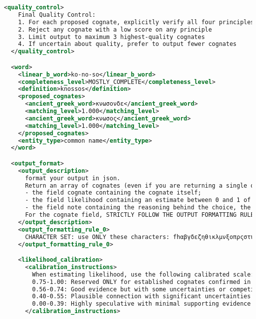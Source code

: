 \begin{lstlisting}[style=mystyle, language=XML, breaklines=true]
  <quality_control>
    Final Quality Control:
    1. For each proposed cognate, explicitly verify all four principles
    2. Reject any cognate with a low score on any principle
    3. Limit output to maximum 3 highest-quality cognates
    4. If uncertain about quality, prefer to output fewer cognates
  </quality_control>

  <word>
    <linear_b_word>ko-no-so</linear_b_word>
    <completeness_level>MOSTLY_COMPLETE</completeness_level>
    <definition>knossos</definition>
    <proposed_cognates>
      <ancient_greek_word>κνωσονδε</ancient_greek_word>
      <matching_level>1.000</matching_level>
      <ancient_greek_word>κνωσος</ancient_greek_word>
      <matching_level>1.000</matching_level>
    </proposed_cognates>
    <entity_type>common name</entity_type>
  </word>

  <output_format>
    <output_description>
      format your output in json.
      Return an array of cognates (even if you are returning a single one) containing three fields:
      - the field cognate containing the cognate itself;
      - the field likelihood containing an estimate between 0 and 1 of how much you are sure the words are cognates, according to rules specified below in the section likelihood calibration and downweighting.
      - the field note containing the reasoning behind the choice, the applied phenomena and the passed and unpassed checks.
      For the cognate field, STRICTLY FOLLOW THE OUTPUT FORMATTING RULES
    </output_description>
    <output_formatting_rule_0>
      CHARACTER SET: use ONLY these characters: fhαβγδεζηθικλμνξοπρςστυφχψω. DO NOT use accents, breathing marks, subscript iota, or other diacritics.FORMAT: Output up to 3 cognates.
    </output_formatting_rule_0>

    <likelihood_calibration>
      <calibration_instructions>
        When estimating likelihood, use the following calibrated scale:
        0.75-1.00: Reserved ONLY for established cognates confirmed in scholarly literature with near certainty
        0.56-0.74: Good evidence but with some uncertainties or competing explanations
        0.40-0.55: Plausible connection with significant uncertainties
        0.00-0.39: Highly speculative with minimal supporting evidence
      </calibration_instructions>


\end{lstlisting}

